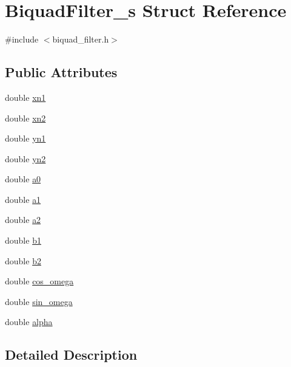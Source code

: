 \hypertarget{struct_biquad_filter__s}{}\section{Biquad\+Filter\+\_\+s Struct Reference}
\label{struct_biquad_filter__s}


{\ttfamily \#include $<$biquad\+\_\+filter.\+h$>$}

\subsection*{Public Attributes}
\begin{DoxyCompactItemize}
\item 
double \hyperlink{struct_biquad_filter__s_ac8a503a85b25dd64762f4044f1256c53}{xn1}
\item 
double \hyperlink{struct_biquad_filter__s_a98b148686768e9db5e1c97e421091446}{xn2}
\item 
double \hyperlink{struct_biquad_filter__s_a2b5af3ba87cf790499e42f714b935d44}{yn1}
\item 
double \hyperlink{struct_biquad_filter__s_a0c37c0366f8e73009c6b9522f657acda}{yn2}
\item 
double \hyperlink{struct_biquad_filter__s_aedc2ad3a6e7ed9ceed83612bad22767d}{a0}
\item 
double \hyperlink{struct_biquad_filter__s_a3faa97cfbda027134a64893c7a2a3777}{a1}
\item 
double \hyperlink{struct_biquad_filter__s_a0ba817d863bdeaae5d065bf72b514128}{a2}
\item 
double \hyperlink{struct_biquad_filter__s_ab63761542af0c3f5125b0db0fd916bac}{b1}
\item 
double \hyperlink{struct_biquad_filter__s_a828654a21d4b032c1293c415126d323b}{b2}
\item 
double \hyperlink{struct_biquad_filter__s_a0f39a79d9bc160279be36b217878c689}{cos\+\_\+omega}
\item 
double \hyperlink{struct_biquad_filter__s_a7d784cea5e8756f4debb97f7e7e99893}{sin\+\_\+omega}
\item 
double \hyperlink{struct_biquad_filter__s_a4b7c5d8216e48600c7f41ba07a28a19f}{alpha}
\end{DoxyCompactItemize}


\subsection{Detailed Description}


